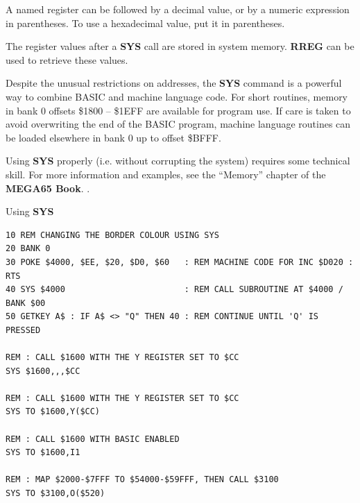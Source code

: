 \begin{description}[leftmargin=2cm,style=nextline]
                  A named register can be followed by a decimal value, or by a numeric expression in parentheses. To use a hexadecimal value, put it in parentheses.

\item [Remarks:]  The register values after a {\bf SYS} call are stored in system memory. {\bf RREG} can be used to retrieve these values.

                  Despite the unusual restrictions on addresses, the {\bf SYS} command is a powerful way to combine BASIC and machine language code. For short routines, memory in bank 0 offsets \$1800 -- \$1EFF are available for program use. If care is taken to avoid overwriting the end of the BASIC program, machine language routines can be loaded elsewhere in bank 0 up to offset \$BFFF.

                  Using {\bf SYS} properly (i.e. without corrupting the system) requires some technical skill. For more information and examples, see \ifdefined\printmanual
                     the ``Memory'' chapter of the {\bf MEGA65 Book}.
                  \else
                     .
                  \fi

\item [Example:]  Using {\bf SYS}

\begin{tcolorbox}[colback=black,coltext=white]
\verbatimfont{\codefont}
\begin{verbatim}
10 REM CHANGING THE BORDER COLOUR USING SYS
20 BANK 0
30 POKE $4000, $EE, $20, $D0, $60   : REM MACHINE CODE FOR INC $D020 : RTS
40 SYS $4000                        : REM CALL SUBROUTINE AT $4000 / BANK $00
50 GETKEY A$ : IF A$ <> "Q" THEN 40 : REM CONTINUE UNTIL 'Q' IS PRESSED

REM : CALL $1600 WITH THE Y REGISTER SET TO $CC
SYS $1600,,,$CC

REM : CALL $1600 WITH THE Y REGISTER SET TO $CC
SYS TO $1600,Y($CC)

REM : CALL $1600 WITH BASIC ENABLED
SYS TO $1600,I1

REM : MAP $2000-$7FFF TO $54000-$59FFF, THEN CALL $3100
SYS TO $3100,O($520)
\end{verbatim}
\end{tcolorbox}
\end{description}


\newpage
